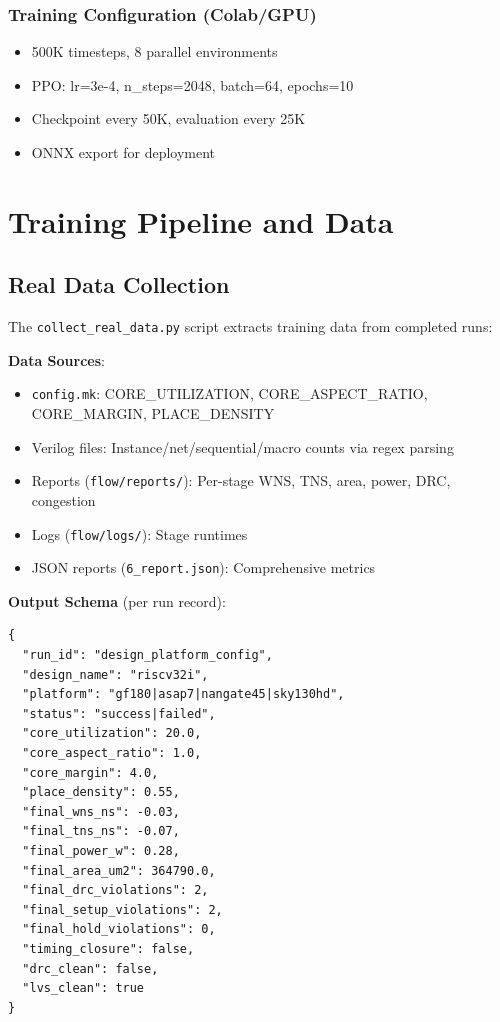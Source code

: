 \documentclass[10pt,conference]{IEEEtran}
\newcommand{\ORFS}{\text{ORFS}}
\begin{document}
\subsubsection{Training Configuration (Colab/GPU)}
\begin{itemize}
    \item 500K timesteps, 8 parallel environments
    \item PPO: lr=3e-4, n\_steps=2048, batch=64, epochs=10
    \item Checkpoint every 50K, evaluation every 25K
    \item ONNX export for deployment
\end{itemize}


\section{Training Pipeline and Data}
\label{sec:training_pipeline}

\subsection{Real Data Collection}
\label{sec:data_collection}

The \texttt{collect\_real\_data.py} script extracts training data from completed \ORFS{} runs:

\textbf{Data Sources}:
\begin{itemize}
    \item \texttt{config.mk}: CORE\_UTILIZATION, CORE\_ASPECT\_RATIO, CORE\_MARGIN, PLACE\_DENSITY
    \item Verilog files: Instance/net/sequential/macro counts via regex parsing
    \item Reports (\texttt{flow/reports/}): Per-stage WNS, TNS, area, power, DRC, congestion
    \item Logs (\texttt{flow/logs/}): Stage runtimes
    \item JSON reports (\texttt{6\_report.json}): Comprehensive \ORFS{} metrics
\end{itemize}

\textbf{Output Schema} (per run record):
\begin{verbatim}
{
  "run_id": "design_platform_config",
  "design_name": "riscv32i",
  "platform": "gf180|asap7|nangate45|sky130hd",
  "status": "success|failed",
  "core_utilization": 20.0,
  "core_aspect_ratio": 1.0,
  "core_margin": 4.0,
  "place_density": 0.55,
  "final_wns_ns": -0.03,
  "final_tns_ns": -0.07,
  "final_power_w": 0.28,
  "final_area_um2": 364790.0,
  "final_drc_violations": 2,
  "final_setup_violations": 2,
  "final_hold_violations": 0,
  "timing_closure": false,
  "drc_clean": false,
  "lvs_clean": true
}
\end{verbatim}
\end{document}
